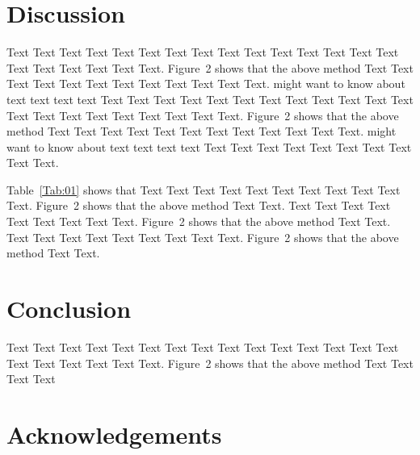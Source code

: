 \documentclass{bioinfo}
\begin{document}
\section{Discussion}

Text Text Text Text Text Text  Text Text Text Text Text Text Text
Text Text  Text Text Text Text Text Text.
Figure~2\vphantom{\ref{fig:02}} shows that the above method  Text
Text Text Text  Text Text Text Text Text Text  Text Text.
\citealp{Boffelli03} might want to know about  text text text text
Text Text Text Text Text Text  Text Text Text Text Text Text Text
Text Text  Text Text Text Text Text Text.
Figure~2\vphantom{\ref{fig:02}} shows that the above method  Text
Text Text Text  Text Text Text Text Text Text  Text Text.
\citealp{Boffelli03} might want to know about  text text text text
Text Text Text Text Text Text Text Text Text Text.




Table~\ref{Tab:01} shows that Text Text Text Text Text  Text Text
Text Text Text Text. Figure~2\vphantom{\ref{fig:02}} shows that
the above method Text Text. Text Text Text  Text Text Text Text
Text Text. Figure~2\vphantom{\ref{fig:02}} shows that the above
method Text Text. Text Text Text  Text Text Text Text Text Text.
Figure~2\vphantom{\ref{fig:02}} shows that the above method Text
Text.









%
%






\section{Conclusion}

Text Text Text Text Text Text  Text Text Text Text Text Text Text
Text Text  Text Text Text Text Text Text.
Figure~2\vphantom{\ref{fig:02}} shows that the above method  Text
Text Text Text\vspace*{-10pt}


\section*{Acknowledgements}
\end{document}
